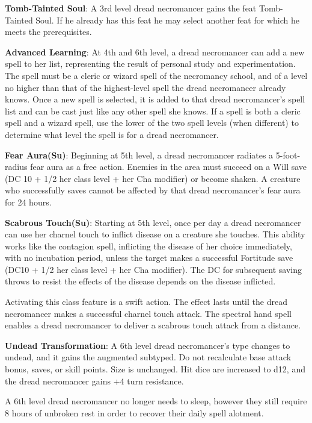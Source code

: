 \textbf{Tomb-Tainted Soul}: A 3rd level dread necromancer gains the feat Tomb-Tainted Soul. If he already has this feat he may select another feat for which he meets the prerequisites.

\textbf{Advanced Learning}: At 4th and 6th level, a dread necromancer can add a new spell to her list, representing the result of personal study and experimentation. The spell must be a cleric or wizard spell of the necromancy school, and of a level no higher than that of the highest-level spell the dread necromancer already knows. Once a new spell is selected, it is added to that dread necromancer's spell list and can be cast just like any other spell she knows. If a spell is both a cleric spell and a wizard spell, use the lower of the two spell levels (when different) to determine what level the spell is for a dread necromancer.

\textbf{Fear Aura(Su)}: Beginning at 5th level, a dread necromancer radiates a 5-foot-radius fear aura as a free action. Enemies in the area must succeed on a Will save (DC 10 + 1/2 her class level + her Cha modifier) or become shaken. A creature who successfully saves cannot be affected by that dread necromancer's fear aura for 24 hours.

\textbf{Scabrous Touch(Su)}: Starting at 5th level, once per day a dread necromancer can use her charnel touch to inflict disease on a creature she touches. This ability works like the contagion spell, inflicting the disease of her choice immediately, with no incubation period, unless the target makes a successful Fortitude save (DC10 + 1/2 her class level + her Cha modifier). The DC for subsequent saving throws to resist the effects of the disease depends on the disease inflicted.

Activating this class feature is a swift action. The effect lasts until the dread necromancer makes a successful charnel touch attack. The spectral hand spell enables a dread necromancer to deliver a scabrous touch attack from a distance.

\textbf{Undead Transformation}: A 6th level dread necromancer's type changes to undead, and it gains the augmented subtyped. Do not recalculate base attack bonus, saves, or skill points. Size is unchanged. Hit dice are increased to d12, and the dread necromancer gains +4 turn resistance.

A 6th level dread necromancer no longer needs to sleep, however they still require 8 hours of unbroken rest in order to recover their daily spell alotment. 

